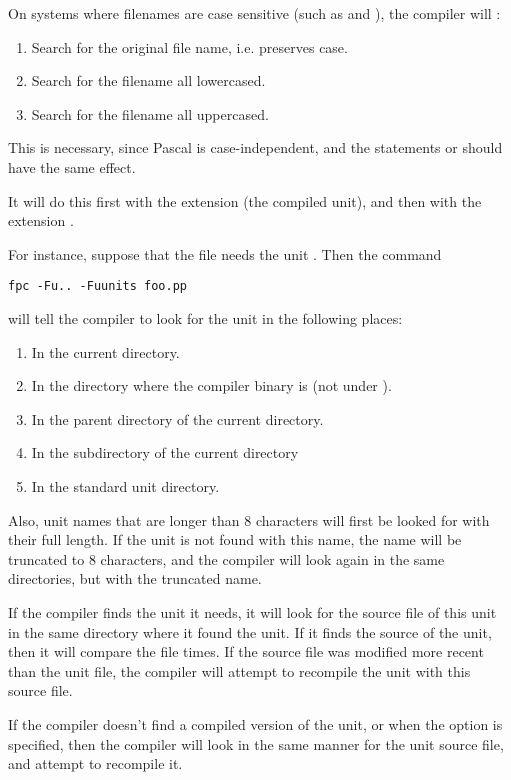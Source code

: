 On systems where filenames are case sensitive (such as \unix and \linux),
the compiler will :
\begin{enumerate}
\item Search for the original file name, i.e. preserves case.
\item Search for the filename all lowercased.
\item Search for the filename all uppercased.
\end{enumerate}
This is necessary, since Pascal is case-independent, and the statements
 or  should have the same effect.

It will do this first with the extension  (the compiled unit),
 and then with the extension .

For instance, suppose that the file  needs the unit
. Then the command
\begin{verbatim}
fpc -Fu.. -Fuunits foo.pp
\end{verbatim}
will tell the compiler to look for the unit  in the following
places:
\begin{enumerate}
\item In the current directory.
\item In the directory where the compiler binary is (not under \linux).
\item In the parent directory of the current directory.
\item In the subdirectory  of the current directory
\item In the standard unit directory.
\end{enumerate}


Also, unit names that are longer than 8 characters will first be looked for
with their full length. If the unit is not found with this name, the name
will be truncated to 8 characters, and the compiler will look again in the
same directories, but with the truncated name.


If the compiler finds the unit it needs, it will look for the source file of
this unit in the same directory where it found the unit.
If it finds the source of the unit, then it will compare the file times.
If the source file was modified more recent than the unit file, the
compiler will attempt to recompile the unit with this source file.

If the compiler doesn't find a compiled version of the unit, or when the
 option is specified, then the compiler will look in the same
manner for the unit source file, and attempt to recompile it.

